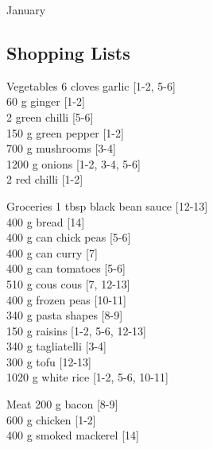 \begin{menu}{January}
    \subsection*{Shopping Lists}
      \begin{shoppinglist}{Vegetables}
      6 cloves garlic {\scriptsize[1-2, 5-6]}\\
      60 g ginger {\scriptsize[1-2]}\\
      2  green chilli {\scriptsize[5-6]}\\
      150 g green pepper {\scriptsize[1-2]}\\
      700 g mushrooms {\scriptsize[3-4]}\\
      1200 g onions {\scriptsize[1-2, 3-4, 5-6]}\\
      2  red chilli {\scriptsize[1-2]}\\
      \end{shoppinglist}%
      \begin{shoppinglist}{Groceries}
      1 tbsp black bean sauce {\scriptsize[12-13]}\\
      400 g bread {\scriptsize[14]}\\
      400 g can chick peas {\scriptsize[5-6]}\\
      400 g can curry {\scriptsize[7]}\\
      400 g can tomatoes {\scriptsize[5-6]}\\
      510 g cous cous {\scriptsize[7, 12-13]}\\
      400 g frozen peas {\scriptsize[10-11]}\\
      340 g pasta shapes {\scriptsize[8-9]}\\
      150 g raisins {\scriptsize[1-2, 5-6, 12-13]}\\
      340 g tagliatelli {\scriptsize[3-4]}\\
      300 g tofu {\scriptsize[12-13]}\\
      1020 g white rice {\scriptsize[1-2, 5-6, 10-11]}\\
      \end{shoppinglist}%
      \par\vfil %
      \begin{shoppinglist}{Meat}
      200 g bacon {\scriptsize[8-9]}\\
      600 g chicken {\scriptsize[1-2]}\\
      400 g smoked mackerel {\scriptsize[14]}\\
      \end{shoppinglist}%

\end{menu}
